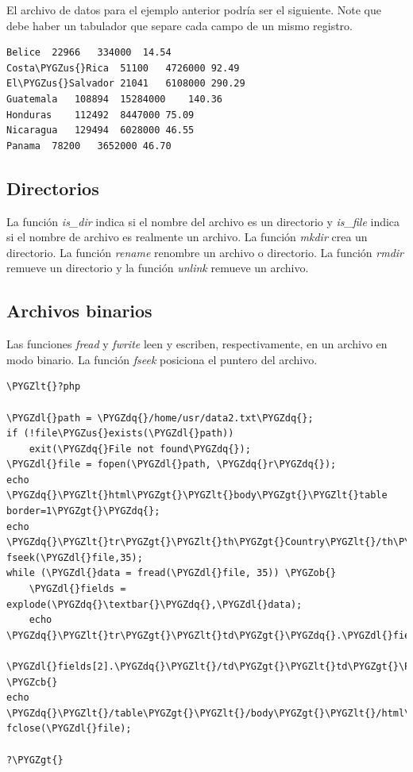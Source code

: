\documentclass[a5paper,10pt,spanish]{sphinxmanual}
\def\PYGZus{\char`\_}
\def\PYGZob{\char`\{}
\def\PYGZcb{\char`\}}
\def\PYGZlt{\char`\<}
\def\PYGZgt{\char`\>}
\def\PYGZdl{\char`\$}
\def\PYGZdq{\char`\"}
\begin{document}
El archivo de datos para el ejemplo anterior podría ser el siguiente.
Note que debe haber un tabulador que separe cada campo de un mismo
registro.

\begin{Verbatim}[commandchars=\\\{\}]
Belice  22966   334000  14.54
Costa\PYGZus{}Rica  51100   4726000 92.49
El\PYGZus{}Salvador 21041   6108000 290.29
Guatemala   108894  15284000    140.36
Honduras    112492  8447000 75.09
Nicaragua   129494  6028000 46.55
Panama  78200   3652000 46.70
\end{Verbatim}


\subsection{Directorios}
\label{Tutorial4_Archivos.md:directorios}
La función \emph{is\_dir} indica si el nombre del archivo es un directorio y
\emph{is\_file} indica si el nombre de archivo es realmente un archivo. La
función \emph{mkdir} crea un directorio. La función \emph{rename} renombre un
archivo o directorio. La función \emph{rmdir} remueve un directorio y la
función \emph{unlink} remueve un archivo.


\subsection{Archivos binarios}
\label{Tutorial4_Archivos.md:archivos-binarios}
Las funciones \emph{fread} y \emph{fwrite} leen y escriben, respectivamente, en un
archivo en modo binario. La función \emph{fseek} posiciona el puntero del
archivo.

\begin{Verbatim}[commandchars=\\\{\}]
\PYGZlt{}?php

\PYGZdl{}path = \PYGZdq{}/home/usr/data2.txt\PYGZdq{};
if (!file\PYGZus{}exists(\PYGZdl{}path))
    exit(\PYGZdq{}File not found\PYGZdq{});
\PYGZdl{}file = fopen(\PYGZdl{}path, \PYGZdq{}r\PYGZdq{});
echo \PYGZdq{}\PYGZlt{}html\PYGZgt{}\PYGZlt{}body\PYGZgt{}\PYGZlt{}table border=1\PYGZgt{}\PYGZdq{};
echo \PYGZdq{}\PYGZlt{}tr\PYGZgt{}\PYGZlt{}th\PYGZgt{}Country\PYGZlt{}/th\PYGZgt{}\PYGZlt{}th\PYGZgt{}Area\PYGZlt{}/th\PYGZgt{}\PYGZlt{}th\PYGZgt{}Population\PYGZlt{}/th\PYGZgt{}\PYGZlt{}th\PYGZgt{}Density\PYGZlt{}/th\PYGZgt{}\PYGZlt{}/tr\PYGZgt{}\PYGZdq{};
fseek(\PYGZdl{}file,35);
while (\PYGZdl{}data = fread(\PYGZdl{}file, 35)) \PYGZob{}
    \PYGZdl{}fields = explode(\PYGZdq{}\textbar{}\PYGZdq{},\PYGZdl{}data);
    echo \PYGZdq{}\PYGZlt{}tr\PYGZgt{}\PYGZlt{}td\PYGZgt{}\PYGZdq{}.\PYGZdl{}fields[0].\PYGZdq{}\PYGZlt{}/td\PYGZgt{}\PYGZlt{}td\PYGZgt{}\PYGZdq{}.\PYGZdl{}fields[1].\PYGZdq{}\PYGZlt{}/td\PYGZgt{}\PYGZlt{}td\PYGZgt{}\PYGZdq{}.
         \PYGZdl{}fields[2].\PYGZdq{}\PYGZlt{}/td\PYGZgt{}\PYGZlt{}td\PYGZgt{}\PYGZdq{}.\PYGZdl{}fields[3].\PYGZdq{}\PYGZlt{}/td\PYGZgt{}\PYGZlt{}/tr\PYGZgt{}\PYGZdq{};
\PYGZcb{}
echo \PYGZdq{}\PYGZlt{}/table\PYGZgt{}\PYGZlt{}/body\PYGZgt{}\PYGZlt{}/html\PYGZgt{}\PYGZdq{};
fclose(\PYGZdl{}file);

?\PYGZgt{}
\end{Verbatim}
\end{document}
